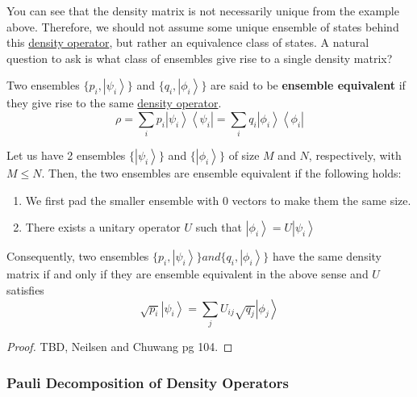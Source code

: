\documentclass{article}
\newcommand{\ket}[1]{\ensuremath{\left|#1\right\rangle}}
\newcommand{\bra}[1]{\ensuremath{\left\langle#1\right|}}
\newcounter{question}[section]
\newcounter{theorem}[section]
\newcounter{definition}[section]
\newcounter{example}[section]
\begin{document}
      You can see that the density matrix is not necessarily unique from the example above. Therefore, we should not assume some unique ensemble of states behind this \hyperref[def:density-operator]{density operator}, but rather an equivalence class of states. A natural question to ask is what class of ensembles give rise to a single density matrix? 

      \begin{definition}
        \label{def:ensemble-equivalence}
        Two ensembles $\{p_i, \ket{\psi_i}\}$ and $\{q_i, \ket{\phi_i}\}$ are said to be \textbf{ensemble equivalent} if they give rise to the same \hyperref[def:density-operator]{density operator}. 
        \begin{equation}
          \rho = \sum_i p_i \ket{\psi_i} \bra{\psi_i} = \sum_i q_i \ket{\phi_i} \bra{\phi_i}
        \end{equation}
      \end{definition}

      \begin{theorem}
        \label{thm:ensemble-equivalence}
        Let us have 2 ensembles $\{\ket{\psi_i}\}$ and $\{\ket{\phi_i}\}$ of size $M$ and $N$, respectively, with $M \leq N$. Then, the two ensembles are ensemble equivalent if the following holds: 
        \begin{enumerate}
          \item We first pad the smaller ensemble with $0$ vectors to make them the same size. 
          \item There exists a unitary operator $U$ such that $\ket{\phi_i} = U \ket{\psi_i}$
        \end{enumerate}
        Consequently, two ensembles $\{p_i, \ket{\psi_i}\} and \{q_i, \ket{\phi_i}\}$ have the same density matrix if and only if they are ensemble equivalent in the above sense and $U$ satisfies 
        \begin{equation}
          \sqrt{p_i} \ket{\psi_i} = \sum_j U_{ij} \sqrt{q_j} \ket{\phi_j}
        \end{equation}
      \end{theorem}
      \begin{proof}
        TBD, Neilsen and Chuwang pg 104. 
      \end{proof}

    \subsubsection{Pauli Decomposition of Density Operators}
\end{document}
